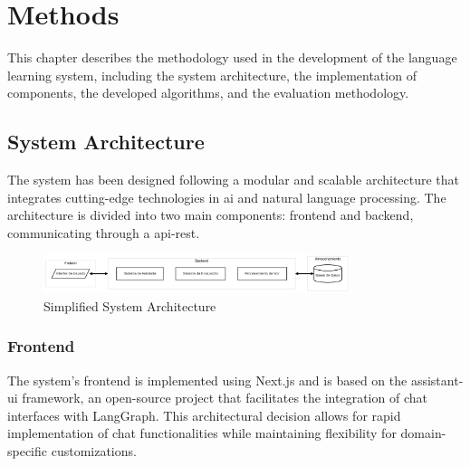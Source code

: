 \chapter{Methods}
\label{metodos}

This chapter describes the methodology used in the development of the language learning system, including the system architecture, the implementation of components, the developed algorithms, and the evaluation methodology.

\section{System Architecture}
\label{arquitectura-sistema}

The system has been designed following a modular and scalable architecture that integrates cutting-edge technologies in \gls{ai} and natural language processing. The architecture is divided into two main components: frontend and backend, communicating through a \gls{api-rest}.

\begin{figure}[H]
	\centering
	\includegraphics[width=0.8\textwidth]{figuras/system-overview.png}
	\caption{Simplified System Architecture}
	\label{fig:arquitectura-sistema}
\end{figure}


\subsection{Frontend}
\label{frontend}

The system's frontend is implemented using Next.js and is based on the \gls{assistant-ui} framework, an \gls{open-source} project that facilitates the integration of chat interfaces with LangGraph. This architectural decision allows for rapid implementation of chat functionalities while maintaining flexibility for domain-specific customizations.

